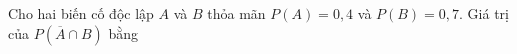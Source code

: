 \begin{ex}
Cho hai biến cố độc lập $A$ và $B$ thỏa mãn $P(A)=0{,}4$ và $P(B)=0{,}7$. Giá trị của $P\left(\overline A\cap B\right)$ bằng
\end{ex}
